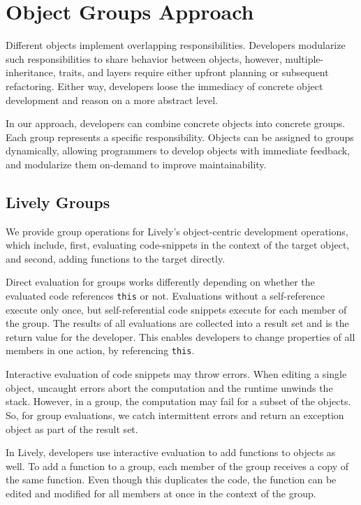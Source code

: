 \section{Object Groups Approach} \label{sec:APPROACH}

Different objects implement overlapping
responsibilities. Developers modularize such responsibilities to 
share behavior between objects, however, multiple-inheritance, traits,
and layers require either upfront planning or subsequent
refactoring. Either way, developers loose the immediacy of concrete
object development and reason on a more abstract level.

In our approach, developers can combine concrete objects into
concrete groups. Each group represents a specific responsibility. Objects can
be assigned to groups dynamically, allowing programmers to develop
objects with immediate feedback, and modularize them on-demand to
improve maintainability.

\subsection{Lively Groups}

We provide group operations for Lively's object-centric development operations, which include, first, evaluating code-snippets in the
context of the target object, and second, adding functions to the
target directly.

Direct evaluation for groups works differently depending on whether
the evaluated code references \texttt{this} or not. Evaluations
without a self-reference execute only once, but self-referential code
snippets execute for each member of the group. The results of all
evaluations are collected into a result set and is the return value for the
developer. This enables developers to change properties of all members
in one action, by referencing \texttt{this}.

Interactive evaluation of code snippets may throw errors. When editing
a single object, uncaught errors abort the computation and the
runtime unwinds the stack. However, in a group, the computation may
fail for a subset of the objects. So, for group evaluations, we catch
intermittent errors and return an exception object as part of the
result set.

In Lively, developers use interactive evaluation to add functions to
objects as well. To add a function to a group, each member of the
group receives a copy of the same function. Even though this duplicates
the code, the function can be edited and modified for all members at once in the context of the group.

